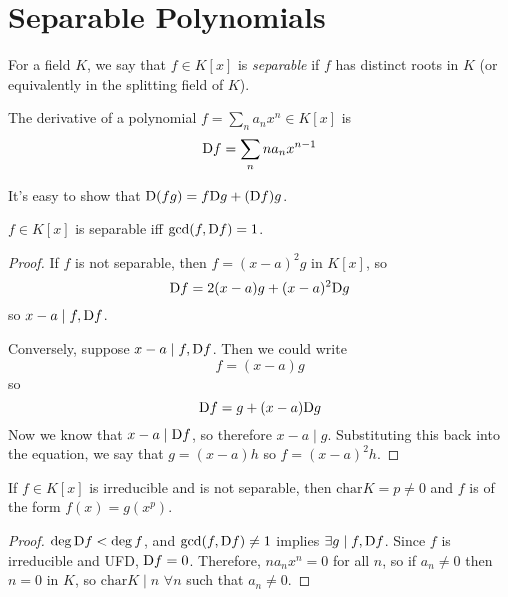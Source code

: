 \documentclass[a4paper,twoside,master.tex]{subfiles}
\begin{document}

\section{Separable Polynomials}\label{sec:separable_polynomials}

\begin{definition}
    For a field $ K $, we say that $ f \in K[x] $ is \textit{separable} if $ f $ has distinct roots in $ K $ (or equivalently in the splitting field of $ K $).
\end{definition}

The derivative of a polynomial $ f = \sum_n a_n x^n \in K[x] $ is
\begin{equation}
    \mathrm{D} f = \sum_n n a_n x^{n-1}
\end{equation}

It's easy to show that $ \mathrm{D} (fg) = f\mathrm{D} g + (\mathrm{D} f)g $.

\begin{claim}
    $ f \in K[x] $ is separable iff $ \gcd(f ,\mathrm{D} f) = 1 $.
\end{claim}
\begin{proof}
    If $ f $ is not separable, then $ f = (x-a)^2 g $ in $ K[x] $, so
    \begin{equation}
        \mathrm{D} f = 2(x-a)g + (x-a)^2 \mathrm{D} g
    \end{equation}
    so $ x-a \mid f, \mathrm{D} f $.

    Conversely, suppose $ x-a \mid f, \mathrm{D} f $. Then we could write
    \begin{equation}
        f = (x-a)g
    \end{equation}
    so
    \begin{equation}
        \mathrm{D} f = g + (x-a)\mathrm{D} g
    \end{equation}
    Now we know that $ x-a \mid \mathrm{D} f $, so therefore $ x-a\mid g $. Substituting this back into the equation, we say that $ g = (x-a)h $ so $ f = (x-a)^2 h $.
\end{proof}

\begin{claim}
    If $ f \in K[x] $ is irreducible and is not separable, then $ \text{char} K = p \neq 0 $ and $ f $ is of the form $ f(x) = g(x^p) $.
\end{claim}
\begin{proof}
    $ \deg \mathrm{D} f < \deg f $, and $ \gcd(f ,\mathrm{D} f) \neq 1 $ implies $ \exists g \mid f, \mathrm{D} f $. Since $ f $ is irreducible and UFD, $ \mathrm{D} f = 0 $. Therefore, $ n a_n x^n = 0 $ for all $ n $, so if $ a_n \neq 0 $ then $ n = 0 $ in $ K $, so $ \text{char} K \mid n $ $ \forall n $ such that $ a_n \neq 0 $.
\end{proof}
\end{document}
